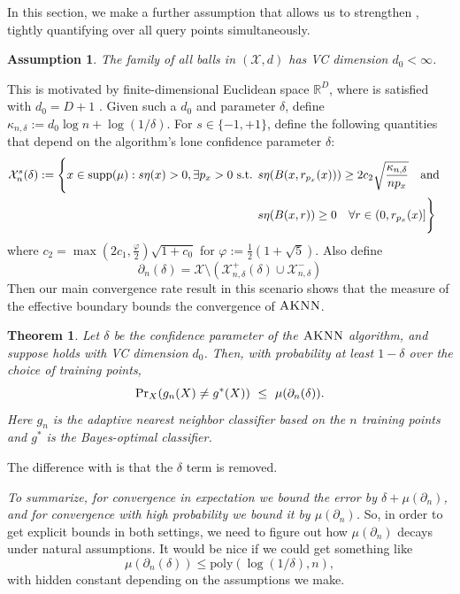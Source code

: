 \documentclass{article}
\def\pr{{\rm Pr}}
\def\X{{\mathcal X}}
\def\supp{{\rm supp}}
\newcommand{\algname}{\textsc{AKNN}}
\newtheorem{theorem}{Theorem}
\newtheorem{assump}{Assumption}
\newcommand{\comment}[3]{}  %
\newcommand{\akshay}[1]{\comment{blue}{Akshay}{#1}}
\begin{document}
In this section, we make a further assumption that allows us to strengthen , tightly quantifying over all query points simultaneously. 
\begin{assump}
\label{assump:VCallballs}
The family of all balls in $(\X, d)$ has VC dimension $d_0 < \infty$.
\end{assump}
This is motivated by finite-dimensional Euclidean space $\mathbb{R}^{D}$, where  is satisfied with $d_0 = D+1$ \citep{dudley79}. Given such a $d_0$ and parameter $\delta$, define $\kappa_{n, \delta} := d_0 \log n + \log (1/\delta)$. 
For $s \in \{ -1, +1 \}$, define the following quantities that depend on the algorithm's lone confidence parameter $\delta$:
\begin{align*}
\X^{s}_n (\delta)
:= \Bigg\{
x \in \supp(\mu) : s \eta(x) > 0 , \exists p_x > 0 \text{ s.t. } 
&s \eta(B(x,r_{p_x}(x))) \geq 2 c_2 \sqrt{\frac{ \kappa_{n, \delta} }{n p_x}}
\quad\text{and}\quad \\
&s \eta(B(x,r)) \geq 0 \quad\forall r \in (0, r_{p_x}(x)]
\Bigg\}
\end{align*}
where $c_2 = \max(2c_1, \frac{\varphi}{2} ) \sqrt{1 + c_0}$ for $\varphi := \frac{1}{2} (1 + \sqrt{5})$.
Also define 
$$ \partial_n (\delta) = \X \setminus (\X^+_{n,\delta} (\delta) \cup \X^-_{n,\delta}) $$
Then our main convergence rate result in this scenario shows that the measure of the effective boundary bounds the convergence of $\algname$.


\begin{theorem}\label{thm:fastrate2}
Let $\delta$ be the confidence parameter of the $\algname$ algorithm, and suppose  holds with VC dimension $d_0$.
Then, with probability at least $1-\delta$ over the choice of training points,
\[ \pr_{X}(g_n(X) \neq g^*(X)) \ \leq \ \mu(\partial_n (\delta)) .\]
Here $g_n$ is the adaptive nearest neighbor classifier based on the $n$ training points and $g^*$ is the Bayes-optimal classifier. 
\end{theorem}

\akshay{Is it worth showing that \Cref{thm:fastrate2} is tight, e.g. the instance-dependent lower bounds of \cite{ChaudhuriDasgupta2014}?}



The difference with  is that the $\delta$ term is removed.

{\it To summarize, for convergence in expectation we bound the error by $\delta + \mu(\partial_n)$,
and for convergence with high probability we bound it by $\mu(\partial_n)$.}
So, in order to get explicit bounds in both settings, we need to figure out how $\mu(\partial_n)$ decays under natural assumptions. It would be nice if we could get something like 
\[\mu(\partial_n (\delta)) \leq \mathrm{poly}\left(\log(1/\delta), n\right),
\]
with hidden constant depending on the assumptions we make.
\akshay{Here I think the smoothness condition introduced in \cite{ChaudhuriDasgupta2014} is relevant.}
\end{document}
